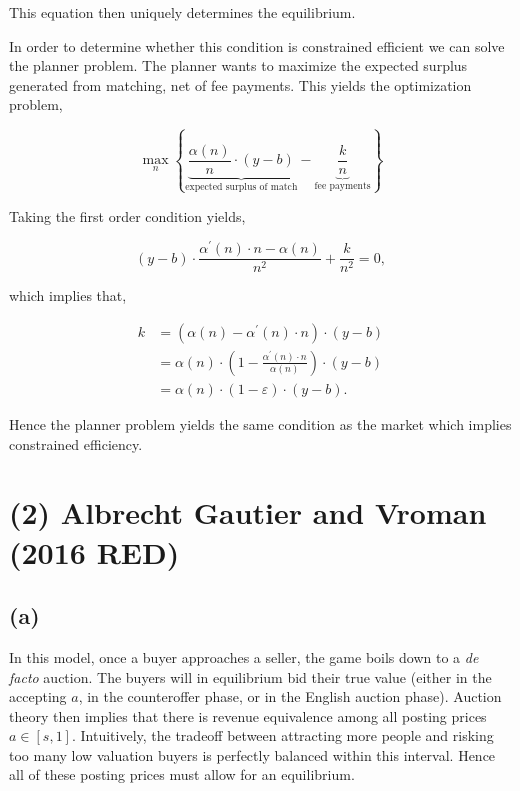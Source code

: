 \documentclass[american]{scrartcl}
\begin{document}
This equation then uniquely determines the equilibrium.

In order to determine whether this condition is constrained efficient we can solve the planner problem. The planner wants to maximize the expected surplus generated from matching, net of fee payments. This yields the optimization problem,

\begin{equation}
    \max_n \left\{ \underbrace{\frac{\alpha(n)}{n} \cdot (y-b)}_{\text{expected surplus of match}} - \underbrace{\frac{k}{n}}_{\text{fee payments}} \right\}
\end{equation}

Taking the first order condition yields,

\begin{equation}
    (y - b) \cdot \frac{\alpha^\prime(n) \cdot n - \alpha(n)}{n^2} + \frac{k}{n^2} = 0,
\end{equation}

which implies that,

\begin{equation}
    \begin{split}
        k &= \left( \alpha(n) - \alpha^\prime(n) \cdot n \right) \cdot ( y - b) \\
        &= \alpha(n) \cdot \left( 1 - \frac{\alpha^\prime(n) \cdot n}{\alpha(n)} \right) \cdot ( y - b) \\
        &= \alpha(n) \cdot (1 - \varepsilon) \cdot (y - b).
    \end{split}
\end{equation}

Hence the planner problem yields the same condition as the market which implies constrained efficiency.

\section*{(2) Albrecht Gautier and Vroman (2016 RED)}

\subsection*{(a)}

In this model, once a buyer approaches a seller, the game boils down to a \textit{de facto} auction. The buyers will in equilibrium bid their true value (either in the accepting $a$, in the counteroffer phase, or in the English auction phase). Auction theory then implies that there is revenue equivalence among all posting prices $a \in [s, 1]$. Intuitively, the tradeoff between attracting more people and risking too many low valuation buyers is perfectly balanced within this interval. Hence all of these posting prices must allow for an equilibrium.
\end{document}

